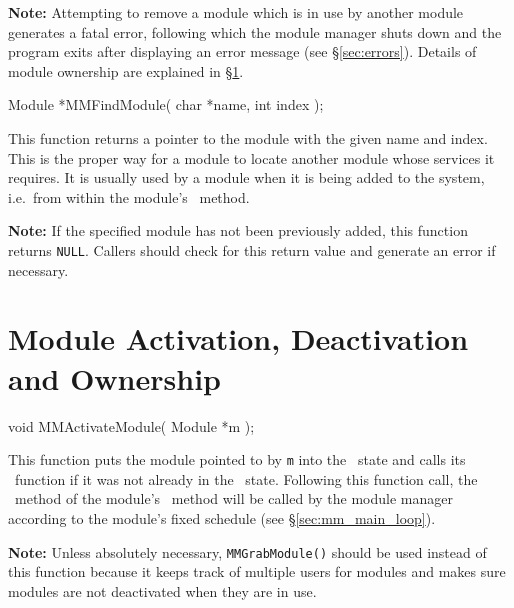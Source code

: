 {\bf Note:} Attempting to remove a module which is in use by another module
generates a fatal error, following which the module manager shuts down and
the program exits after displaying an error message (see
\S\ref{sec:errors}). Details of module ownership are explained in
\S\ref{sec:mm_activation}.


\begin{prototype}
Module *MMFindModule( char *name, int index );
\end{prototype}

This function returns a pointer to the module with the given name and
index. This is the proper way for a module to locate another module whose
services it requires. It is usually used by a module when it is being added
to the system, i.e.\ from within the module's \initFN\ method.

{\bf Note:} If the specified module has not been previously added, this function
returns {\tt NULL}. Callers should check for this return value and generate
an error if necessary.


\section{Module Activation, Deactivation and Ownership}
\label{sec:mm_activation}

\begin{prototype}
void MMActivateModule( Module *m );
\end{prototype}

This function puts the module pointed to by {\tt *m} into the \ModuleActive\
state and calls its \activateFN\ function if it was not already in the
\ModuleActive\ state. Following this function call, the \updateFN\ method of
the module's \updateFN\ method will be called by the module manager
according to the module's fixed schedule (see \S\ref{sec:mm_main_loop}).

{\bf Note:} Unless absolutely necessary, {\tt MMGrabModule()} should be used
instead of this function because it keeps track of multiple users for
modules and makes sure modules are not deactivated when they are in use.


